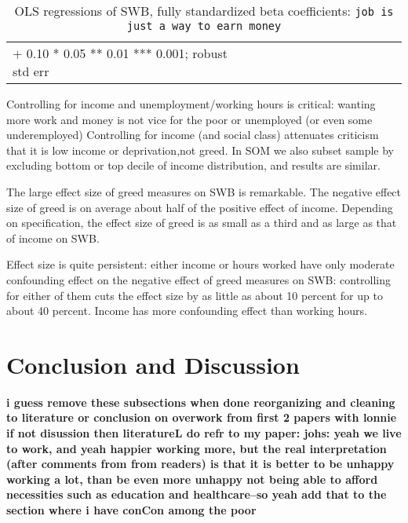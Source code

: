 \documentclass[10pt, letterpaper]{article}
\begin{document}
\begin{spacing}{1.8}
\begin{spacing}{.9} \begin{table}[H]\centering   \begin{scriptsize} \begin{tabular}{p{1.8in}p{.5in}p{.5in}p{.5in}p{.5in}p{.5in}p{.5in}p{.5in}p{.5in}p{.5in}p{.5 in}p{.5in}p{.5 in}}\hline  \hline + 0.10 * 0.05 ** 0.01 *** 0.001; robust std err \end{tabular}\end{scriptsize}\caption{\label{betad}OLS regressions of SWB, fully standardized beta coefficients: \texttt{job is just a way to earn money}}\end{table} \end{spacing}


Controlling for income and unemployment/working hours is critical: wanting more work and money
is not vice for the poor or unemployed (or even some underemployed)
Controlling for income (and social class) attenuates criticism  that it is low
income or deprivation,not greed. In SOM we also subset sample by excluding
bottom or top decile of income distribution, and results are similar.  

The large effect size of greed measures on SWB is remarkable. The negative effect size of
greed is on average about half of the positive effect of income.
Depending on specification, the effect size of greed is as small as a third and
as large as that of income on SWB.

Effect size is quite persistent: either income or hours worked have only
moderate confounding effect on the negative effect of greed measures on SWB:
controlling for either of them cuts the effect size by as little as about 10 percent
for up to about 40 percent. Income has more confounding effect than working hours. 


\section{Conclusion and Discussion}
\textbf{i guess remove these subsections when done reorganizing and cleaning}
\textbf{to literature or conclusion on overwork from first 2 papers with lonnie}
\textbf{if not disussion then literatureL  do refr to my paper: johs: yeah we live to work, and yeah happier working more, but the real interpretation  (after comments from from readers) is that it is better to be unhappy working a lot, than be even more unhappy not being able to afford necessities such as education and healthcare--so yeah add that to the section where i have conCon among the poor}


\end{spacing}
\end{document}
